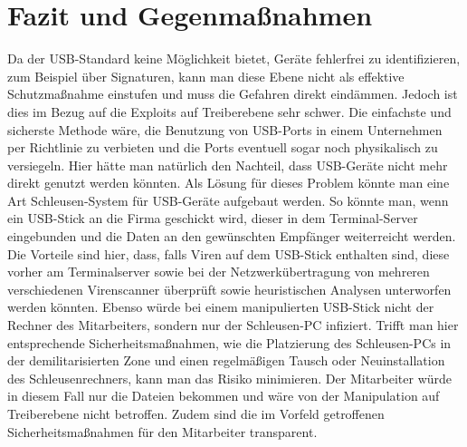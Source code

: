 \chapter{Fazit und Gegenmaßnahmen}
Da der USB-Standard keine Möglichkeit bietet, Geräte fehlerfrei zu identifizieren, zum Beispiel über Signaturen, kann man diese Ebene nicht als effektive Schutzmaßnahme einstufen und muss die Gefahren direkt eindämmen. Jedoch ist dies im Bezug auf die Exploits auf Treiberebene sehr schwer. Die einfachste und sicherste Methode wäre, die Benutzung von USB-Ports in einem Unternehmen per Richtlinie zu verbieten und die Ports eventuell sogar noch physikalisch zu versiegeln. Hier hätte man natürlich den Nachteil, dass USB-Geräte nicht mehr direkt genutzt werden könnten. Als Lösung für dieses Problem könnte man eine Art Schleusen-System für USB-Geräte aufgebaut werden. So könnte man, wenn ein USB-Stick an die Firma geschickt wird, dieser in dem Terminal-Server eingebunden und die Daten an den gewünschten Empfänger weiterreicht werden. Die Vorteile sind hier, dass, falls Viren auf dem USB-Stick enthalten sind, diese vorher am Terminalserver sowie bei der Netzwerkübertragung von mehreren verschiedenen Virenscanner überprüft sowie heuristischen Analysen unterworfen werden könnten. Ebenso würde bei einem manipulierten USB-Stick nicht der Rechner des Mitarbeiters, sondern nur der Schleusen-PC infiziert. Trifft man hier entsprechende Sicherheitsmaßnahmen, wie die Platzierung des Schleusen-PCs in der demilitarisierten Zone und einen regelmäßigen Tausch oder Neuinstallation des Schleusenrechners, kann man das Risiko minimieren. Der Mitarbeiter würde in diesem Fall nur die Dateien bekommen und wäre von der Manipulation auf Treiberebene nicht betroffen. Zudem sind die im Vorfeld getroffenen Sicherheitsmaßnahmen für den Mitarbeiter transparent.